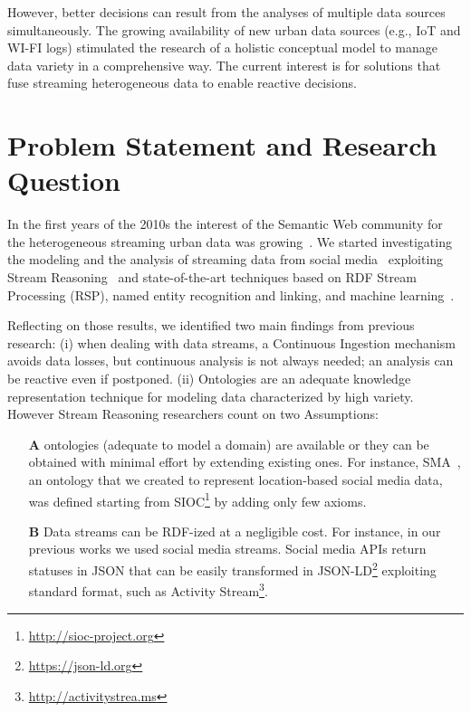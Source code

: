 However, better decisions can result from the analyses of multiple data sources simultaneously. 
The growing availability of new urban data sources (e.g., IoT and WI-FI logs) stimulated the research of a holistic conceptual model to manage data variety in a comprehensive way. 
The current interest is for solutions that fuse streaming heterogeneous data to enable reactive decisions.

\section{Problem Statement and Research Question}\label{sec:prob_rq}

In the first years of the 2010s the interest of the Semantic Web community for the heterogeneous streaming urban data was growing~\cite{cho2011friendship,hristova2016if}.
We started investigating the modeling and the analysis of streaming data from social media~\cite{DBLP:journals/semweb/BalduiniCDVHLKT14,DBLP:conf/semweb/BalduiniVDTPC13} exploiting  Stream Reasoning~\cite{della2009s} and state-of-the-art techniques based on RDF Stream Processing (RSP)\cite{DBLP:journals/ijsc/BarbieriBCVG10}, named entity recognition and linking, and machine learning~\cite{DBLP:journals/semweb/BalduiniCDVHLKT14,DBLP:journals/internet/BalduiniBVHH14}.

Reflecting on those results, we identified two main findings from previous research: (i) when dealing with data streams, a Continuous Ingestion mechanism avoids data losses, but continuous analysis is not always needed; an analysis can be reactive even if postponed. (ii) Ontologies are an adequate knowledge representation technique for modeling data characterized by high variety.
However Stream Reasoning researchers count on two Assumptions:

\begin{itemize}
\item[\textbf{A}] ontologies (adequate to model a domain) are available or they can be obtained with minimal effort by extending existing ones. For instance, SMA~\cite{DBLP:journals/ws/BalduiniCDVHLKT12}, an ontology that we created to represent location-based social media data, was defined starting from SIOC\footnote{\url{http://sioc-project.org}} by adding only few axioms.
\item[\textbf{B}] Data streams can be RDF-ized at a negligible cost. For instance, in our previous works we used social media streams. Social media APIs return statuses in JSON that can be easily transformed in JSON-LD\footnote{\url{https://json-ld.org}} exploiting standard format, such as Activity Stream\footnote{\url{http://activitystrea.ms}}.
\end{itemize}

